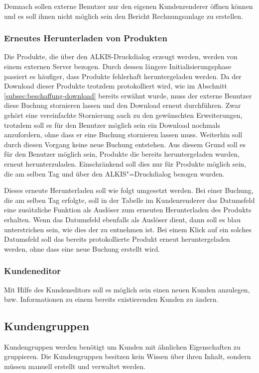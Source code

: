 Demnach sollen externe Benutzer nur den eigenen Kundenrenderer öffnen können und es soll ihnen nicht möglich sein den Bericht Rechnungsanlage zu erstellen.

\subsubsection{Erneutes Herunterladen von Produkten}
Die Produkte, die über den ALKIS-Druckdialog erzeugt werden, werden von einem externen Server bezogen.
Durch dessen längere Initialisierungsphase passiert es häufiger, dass Produkte fehlerhaft heruntergeladen werden.
Da der Download dieser Produkte trotzdem protokolliert wird, wie im Abschnitt \vref{subsec:beschaffung-download} bereits erwähnt wurde, muss der externe Benutzer diese Buchung stornieren lassen und den Download erneut durchführen.
Zwar gehört eine vereinfachte Stornierung auch zu den gewünschten Erweiterungen, trotzdem soll es für den Benutzer möglich sein ein Download nochmals anzufordern, ohne dass er eine Buchung stornieren lassen muss.
Weiterhin soll durch diesen Vorgang keine neue Buchung entstehen.
Aus diesem Grund soll es für den Benutzer möglich sein, Produkte die bereits heruntergeladen wurden, erneut herunterzuladen. Einschränkend soll dies nur für Produkte möglich sein, die am selben Tag und über den ALKIS"=Druckdialog bezogen wurden. 

Dieses erneute Herunterladen soll wie folgt umgesetzt werden. Bei einer Buchung, die am selben Tag erfolgte, soll in der Tabelle im Kundenrenderer das Datumsfeld eine zusätzliche Funktion als Auslöser zum erneuten Herunterladen des Produkts erhalten.
Wenn das Datumsfeld ebenfalls als Auslöser dient, dann soll es blau unterstrichen sein, wie dies der  zu entnehmen ist.
Bei einem Klick auf ein solches Datumsfeld soll das bereits protokollierte Produkt erneut heruntergeladen werden, ohne dass eine neue Buchung erstellt wird.

\subsubsection{Kundeneditor}
Mit Hilfe des Kundeneditors soll es möglich sein einen neuen Kunden anzulegen, bzw. Informationen zu einem bereits existierenden Kunden zu ändern.

\subsection{Kundengruppen}
Kundengruppen werden benötigt um Kunden mit ähnlichen Eigenschaften zu gruppieren.
Die Kundengruppen besitzen kein Wissen über ihren Inhalt, sondern müssen manuell erstellt und verwaltet werden.


